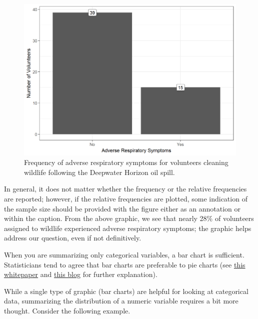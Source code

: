 \documentclass[]{book}
\theoremstyle{plain}
\theoremstyle{mydefn}
\theoremstyle{myexmpl}
\theoremstyle{remark}
\let\BeginKnitrBlock\begin \let\EndKnitrBlock\end
\let\BeginKnitrBlock\begin \let\EndKnitrBlock\end
\begin{document}
\begin{figure}

{\centering \includegraphics[width=0.8\linewidth]{./Images/summaries-deepwater-barchart-1} 

}

\caption{Frequency of adverse respiratory symptoms for volunteers cleaning wildlife following the Deepwater Horizon oil spill.}\label{fig:summaries-deepwater-barchart}
\end{figure}

In general, it does not matter whether the frequency or the relative
frequencies are reported; however, if the relative frequencies are
plotted, some indication of the sample size should be provided with the
figure either as an annotation or within the caption. From the above
graphic, we see that nearly 28\% of volunteers assigned to wildlife
experienced adverse respiratory symptoms; the graphic helps address our
question, even if not definitively.

\BeginKnitrBlock{rmdtip}
When you are summarizing only categorical variables, a bar chart is
sufficient. Statisticians tend to agree that bar charts are preferable
to pie charts (see
\href{https://www.google.com/url?sa=t\&rct=j\&q=\&esrc=s\&source=web\&cd=32\&cad=rja\&uact=8\&ved=0ahUKEwjk6Lf42sfVAhVl64MKHaTdAFY4HhAWCC4wAQ\&url=https\%3A\%2F\%2Fwww.perceptualedge.com\%2Farticles\%2Fvisual_business_intelligence\%2Fsave_the_pies_for_dessert.pdf\&usg=AFQjCNFkS-sogmLsZIOheWAPBZSNcqjzkg}{this
whitepaper} and
\href{http://www.storytellingwithdata.com/blog/2014/06/alternatives-to-pies}{this
blog} for further explanation).
\EndKnitrBlock{rmdtip}

While a single type of graphic (bar charts) are helpful for looking at
categorical data, summarizing the distribution of a numeric variable
requires a bit more thought. Consider the following example.
\end{document}
